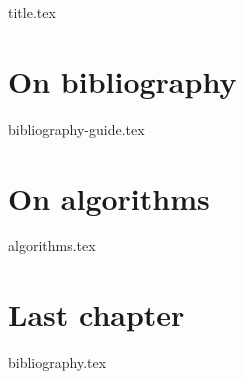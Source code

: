 \documentclass[a4paper,11pt]{book}
\begin{document}
 
\frontmatter
{title.tex}
 
\clearpage
\thispagestyle{empty}
 
\tableofcontents
 
\mainmatter
\chapter{On bibliography}
{bibliography-guide.tex}
 
\chapter{On algorithms}
{algorithms.tex}
 
\chapter{Last chapter}
 
\backmatter
 
{bibliography.tex}
 
\end{document}
